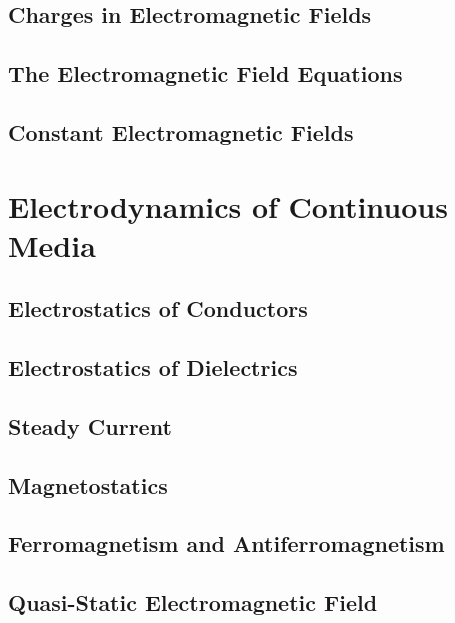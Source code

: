 \documentclass[
    a4paper
    11pt,
    oneside,
    onecolumn,
    openright,
    final
]{memoir}
\numberwithin{equation}{section}
\begin{document}
\chapter[Charges in EM Fields]{Charges in Electromagnetic Fields}




\chapter[The EM Field Equations]{The Electromagnetic Field Equations}

\chapter[Constant EM Fields]{Constant Electromagnetic Fields}

\part{Electrodynamics of Continuous Media}

\chapter{Electrostatics of Conductors}

\chapter{Electrostatics of Dielectrics}

\chapter{Steady Current}

\chapter{Magnetostatics}

\chapter{Ferromagnetism and Antiferromagnetism}

\chapter{Quasi-Static Electromagnetic Field}

\end{document}
